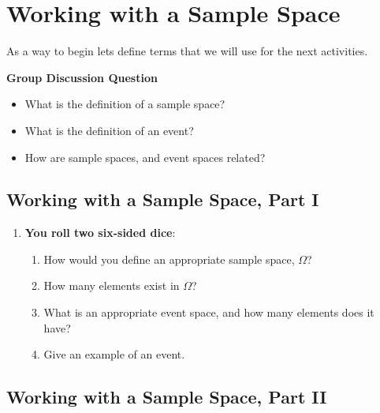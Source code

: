 \documentclass[
]{book}
\providecommand{\tightlist}{%
  \setlength{\itemsep}{0pt}\setlength{\parskip}{0pt}}
\theoremstyle{definition}
\theoremstyle{definition}
\theoremstyle{definition}
\theoremstyle{definition}
\theoremstyle{remark}
\begin{document}
\hypertarget{working-with-a-sample-space}{%
\section{Working with a Sample Space}\label{working-with-a-sample-space}}

As a way to begin lets define terms that we will use for the next activities.

\textbf{Group Discussion Question}

\begin{itemize}
\tightlist
\item
  What is the definition of a sample space?
\item
  What is the definition of an event?
\item
  How are sample spaces, and event spaces related?
\end{itemize}

\hypertarget{working-with-a-sample-space-part-i}{%
\subsection{Working with a Sample Space, Part I}\label{working-with-a-sample-space-part-i}}

\begin{enumerate}
\def\labelenumi{\arabic{enumi}.}
\tightlist
\item
  \textbf{You roll two six-sided dice}:

  \begin{enumerate}
  \def\labelenumii{\arabic{enumii}.}
  \tightlist
  \item
    How would you define an appropriate sample space, \(\Omega\)?
  \item
    How many elements exist in \(\Omega\)?
  \item
    What is an appropriate event space, and how many elements does it have?
  \item
    Give an example of an event.
  \end{enumerate}
\end{enumerate}

\vspace{5cm}

\hypertarget{working-with-a-sample-space-part-ii}{%
\subsection{Working with a Sample Space, Part II}\label{working-with-a-sample-space-part-ii}}
\end{document}
